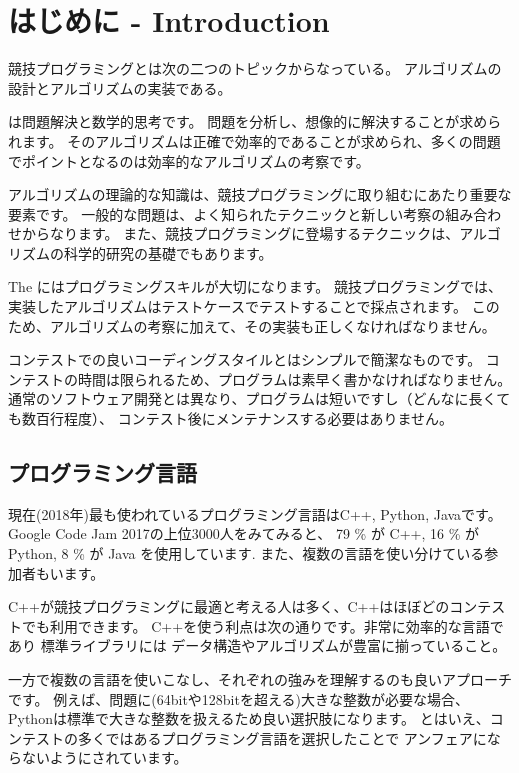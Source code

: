 \chapter{はじめに - Introduction}

競技プログラミングとは次の二つのトピックからなっている。
アルゴリズムの設計とアルゴリズムの実装である。


 は問題解決と数学的思考です。
問題を分析し、想像的に解決することが求められます。
そのアルゴリズムは正確で効率的であることが求められ、多くの問題でポイントとなるのは効率的なアルゴリズムの考察です。

アルゴリズムの理論的な知識は、競技プログラミングに取り組むにあたり重要な要素です。
一般的な問題は、よく知られたテクニックと新しい考察の組み合わせからなります。
また、競技プログラミングに登場するテクニックは、アルゴリズムの科学的研究の基礎でもあります。

The  にはプログラミングスキルが大切になります。
競技プログラミングでは、実装したアルゴリズムはテストケースでテストすることで採点されます。
このため、アルゴリズムの考察に加えて、その実装も正しくなければなりません。


コンテストでの良いコーディングスタイルとはシンプルで簡潔なものです。
コンテストの時間は限られるため、プログラムは素早く書かなければなりません。
通常のソフトウェア開発とは異なり、プログラムは短いですし（どんなに長くても数百行程度）、
コンテスト後にメンテナンスする必要はありません。

\section{プログラミング言語}


現在(2018年)最も使われているプログラミング言語はC++, Python, Javaです。
Google Code Jam 2017の上位3000人をみてみると、
79 \% が C++,
16 \% が Python,
8 \% が Java を使用しています\cite{goo17}.
また、複数の言語を使い分けている参加者もいます。

C++が競技プログラミングに最適と考える人は多く、C++はほぼどのコンテストでも利用できます。
C++を使う利点は次の通りです。非常に効率的な言語であり
標準ライブラリには データ構造やアルゴリズムが豊富に揃っていること。

一方で複数の言語を使いこなし、それぞれの強みを理解するのも良いアプローチです。
例えば、問題に(64bitや128bitを超える)大きな整数が必要な場合、
Pythonは標準で大きな整数を扱えるため良い選択肢になります。
とはいえ、コンテストの多くではあるプログラミング言語を選択したことで
アンフェアにならないようにされています。

